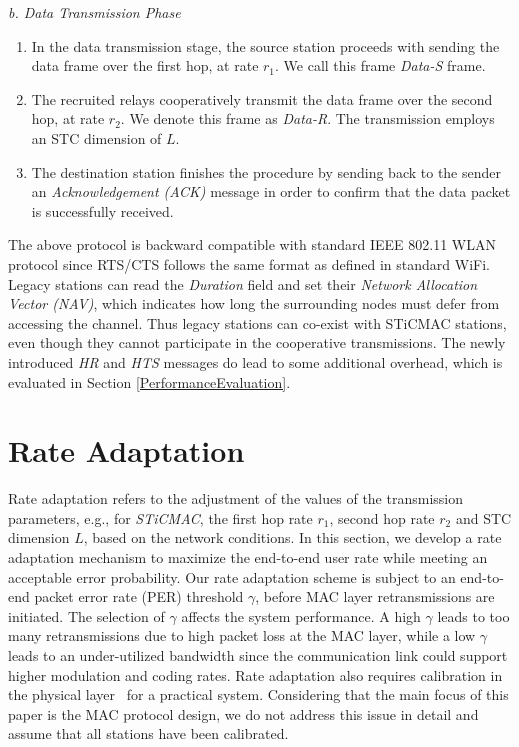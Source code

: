 \documentclass[peerreview,draftcls,onecolumn,12pt,a4paper]{IEEEtran}
\begin{document}
{\em b. Data Transmission Phase}
\begin{enumerate}

 \item In the data transmission stage, the source
station proceeds with sending the data frame over the first hop,
at rate $r_{1}$. We call this frame \emph{Data-S} frame.

\item The recruited relays cooperatively transmit the data frame
over the second hop, at rate $r_{2}$. We denote this frame as
\emph{Data-R}. The transmission employs an STC dimension of $L$.

\item The destination station finishes the procedure by sending
back to the sender an \emph{Acknowledgement (ACK)} message in
order to confirm that the data packet is successfully received.
\end{enumerate}

The above protocol is backward compatible with standard IEEE 802.11 WLAN protocol since RTS/CTS follows the same format as defined in standard WiFi. Legacy stations can read the \emph{Duration} field and set their \emph{Network Allocation Vector (NAV)}, which indicates how long the surrounding nodes must defer from accessing the channel. Thus legacy stations can co-exist with STiCMAC stations, even though they cannot participate in the cooperative transmissions. The newly introduced \emph{HR} and \emph{HTS} messages do lead to some additional overhead, which is evaluated in Section \ref{PerformanceEvaluation}.


\vspace{-0.2in}
\section{Rate Adaptation} \label{sec:rateadapt}

Rate adaptation refers to the adjustment of the values of the
transmission parameters,  e.g., for \emph{STiCMAC}, the first hop
rate $r_1$, second hop rate $r_2$ and STC dimension $L$, based on
the network conditions. In this section, we develop a rate
adaptation mechanism to maximize the end-to-end user rate while
meeting an acceptable error probability. Our rate adaptation
scheme is subject to an end-to-end packet error rate (PER)
threshold $\gamma$, before MAC layer retransmissions are
initiated. The selection of $\gamma$ affects the system
performance. A high $\gamma$ leads to too many retransmissions due
to high packet loss at the MAC layer, while a low $\gamma$ leads
to an under-utilized bandwidth since the communication link could
support higher modulation and coding rates. Rate adaptation also requires calibration in the physical layer~\cite{hardwareCalibrate} for a practical system. Considering that the main focus of this paper is the MAC protocol design, we do not address this issue in detail and assume that all stations have been calibrated.
\end{document}
